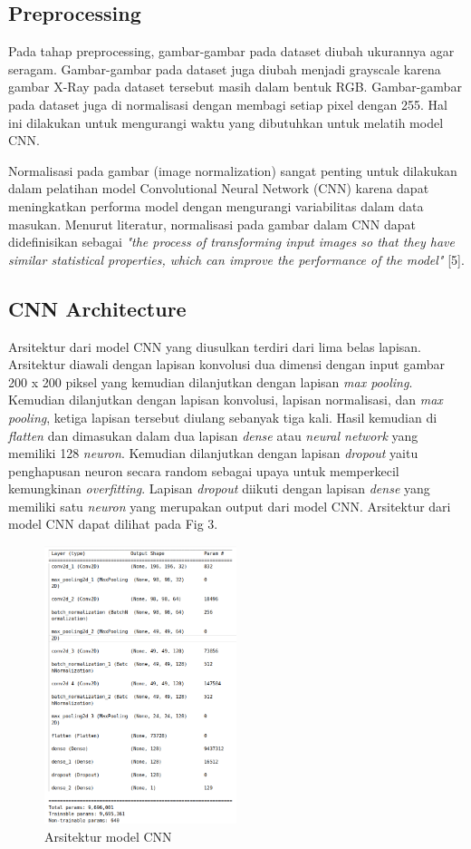 \documentclass[conference]{IEEEtran}
\begin{document}
\subsection{Preprocessing}
Pada tahap preprocessing, gambar-gambar pada dataset diubah ukurannya agar seragam. Gambar-gambar pada dataset juga diubah menjadi grayscale karena gambar X-Ray pada dataset tersebut masih dalam bentuk RGB. Gambar-gambar pada dataset juga di normalisasi dengan membagi setiap pixel dengan 255. Hal ini dilakukan untuk mengurangi waktu yang dibutuhkan untuk melatih model CNN.

Normalisasi pada gambar (image normalization) sangat penting untuk dilakukan dalam pelatihan model Convolutional Neural Network (CNN) karena dapat meningkatkan performa model dengan mengurangi variabilitas dalam data masukan. Menurut literatur, normalisasi pada gambar dalam CNN dapat didefinisikan sebagai \textit{"the process of transforming input images so that they have similar statistical properties, which can improve the performance of the model"} [5].

\subsection{CNN Architecture}
Arsitektur dari model CNN yang diusulkan terdiri dari lima belas lapisan. Arsitektur diawali dengan lapisan konvolusi dua dimensi dengan input gambar 200 x 200 piksel yang kemudian dilanjutkan dengan lapisan \textit{max pooling}. Kemudian dilanjutkan dengan lapisan konvolusi, lapisan normalisasi, dan \textit{max pooling}, ketiga lapisan tersebut diulang sebanyak tiga kali. Hasil kemudian di \textit{flatten} dan dimasukan dalam dua lapisan \textit{dense} atau \textit{neural network} yang memiliki 128 \textit{neuron}. Kemudian dilanjutkan dengan lapisan \textit{dropout} yaitu penghapusan neuron secara random sebagai upaya untuk memperkecil kemungkinan \textit{overfitting}. Lapisan \textit{dropout} diikuti dengan lapisan \textit{dense} yang memiliki satu \textit{neuron} yang merupakan output dari model CNN. Arsitektur dari model CNN dapat dilihat pada Fig 3.

\begin{figure}[htbp]
    \centerline{\includegraphics[width=0.5\textwidth]{figures/cnn_layers.png}}
    \caption{Arsitektur model CNN}
\end{figure}
\end{document}
